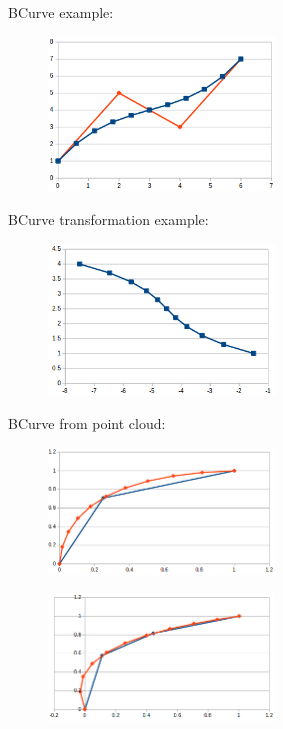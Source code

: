 \documentclass[12pt, a4paper]{article}
\begin{document}
BCurve example:\\
\begin{center}
\begin{figure}[H]
\centering\includegraphics[width=6cm]{./res.png}\\
\end{figure}
\end{center}
BCurve transformation example:\\
\begin{center}
\begin{figure}[H]
\centering\includegraphics[width=6cm]{./resrot.png}\\
\end{figure}
\end{center}
BCurve from point cloud:\\
\begin{center}
\begin{figure}[H]
\centering\includegraphics[width=6cm]{./cloud1.png}\\
\end{figure}
\end{center}
\begin{center}
\begin{figure}[H]
\centering\includegraphics[width=6cm]{./cloud2.png}\\
\end{figure}
\end{center}
\end{document}
